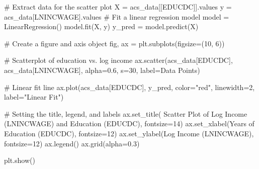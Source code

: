 \documentclass[
  11pt,
  letterpaper,
  DIV=11,
  numbers=noendperiod]{scrartcl}
\newenvironment{Shaded}{\begin{snugshade}}{\end{snugshade}}
\newcommand{\CommentTok}[1]{\textcolor[rgb]{0.37,0.37,0.37}{#1}}
\newcommand{\DecValTok}[1]{\textcolor[rgb]{0.68,0.00,0.00}{#1}}
\newcommand{\FloatTok}[1]{\textcolor[rgb]{0.68,0.00,0.00}{#1}}
\newcommand{\NormalTok}[1]{\textcolor[rgb]{0.00,0.23,0.31}{#1}}
\newcommand{\OperatorTok}[1]{\textcolor[rgb]{0.37,0.37,0.37}{#1}}
\newcommand{\StringTok}[1]{\textcolor[rgb]{0.13,0.47,0.30}{#1}}
\begin{document}
\begin{Shaded}
\begin{Highlighting}[]
\CommentTok{\# Extract data for the scatter plot}
\NormalTok{X }\OperatorTok{=}\NormalTok{ acs\_data[[}\StringTok{\textquotesingle{}EDUCDC\textquotesingle{}}\NormalTok{]].values}
\NormalTok{y }\OperatorTok{=}\NormalTok{ acs\_data[}\StringTok{\textquotesingle{}LNINCWAGE\textquotesingle{}}\NormalTok{].values}
\CommentTok{\# Fit a linear regression model}
\NormalTok{model }\OperatorTok{=}\NormalTok{ LinearRegression()}
\NormalTok{model.fit(X, y)}
\NormalTok{y\_pred }\OperatorTok{=}\NormalTok{ model.predict(X) }

\CommentTok{\# Create a figure and axis object}
\NormalTok{fig, ax }\OperatorTok{=}\NormalTok{ plt.subplots(figsize}\OperatorTok{=}\NormalTok{(}\DecValTok{10}\NormalTok{, }\DecValTok{6}\NormalTok{))}

\CommentTok{\# Scatterplot of education vs. log income}
\NormalTok{ax.scatter(acs\_data[}\StringTok{\textquotesingle{}EDUCDC\textquotesingle{}}\NormalTok{], acs\_data[}\StringTok{\textquotesingle{}LNINCWAGE\textquotesingle{}}\NormalTok{],}
\NormalTok{           alpha}\OperatorTok{=}\FloatTok{0.6}\NormalTok{, s}\OperatorTok{=}\DecValTok{30}\NormalTok{, label}\OperatorTok{=}\StringTok{\textquotesingle{}Data Points\textquotesingle{}}\NormalTok{)}

\CommentTok{\# Linear fit line}
\NormalTok{ax.plot(acs\_data[}\StringTok{\textquotesingle{}EDUCDC\textquotesingle{}}\NormalTok{], y\_pred, color}\OperatorTok{=}\StringTok{"red"}\NormalTok{,}
\NormalTok{        linewidth}\OperatorTok{=}\DecValTok{2}\NormalTok{, label}\OperatorTok{=}\StringTok{"Linear Fit"}\NormalTok{)}

\CommentTok{\# Setting the title, legend, and labels}
\NormalTok{ax.set\_title(}
    \StringTok{\textquotesingle{}Scatter Plot of Log Income (LNINCWAGE) and Education (EDUCDC)\textquotesingle{}}\NormalTok{, fontsize}\OperatorTok{=}\DecValTok{14}\NormalTok{)}
\NormalTok{ax.set\_xlabel(}\StringTok{\textquotesingle{}Years of Education (EDUCDC)\textquotesingle{}}\NormalTok{, fontsize}\OperatorTok{=}\DecValTok{12}\NormalTok{)}
\NormalTok{ax.set\_ylabel(}\StringTok{\textquotesingle{}Log Income (LNINCWAGE)\textquotesingle{}}\NormalTok{, fontsize}\OperatorTok{=}\DecValTok{12}\NormalTok{)}
\NormalTok{ax.legend()}
\NormalTok{ax.grid(alpha}\OperatorTok{=}\FloatTok{0.3}\NormalTok{)}


\NormalTok{plt.show()}
\end{Highlighting}
\end{Shaded}
\end{document}
